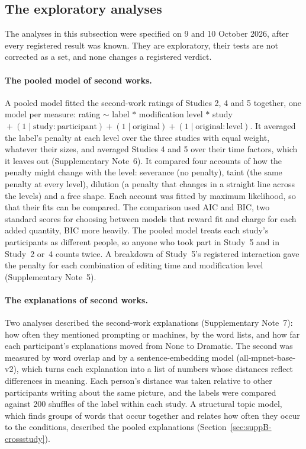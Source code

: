 \subsection*{The exploratory analyses}

The analyses in this subsection were specified on 9 and 10 October 2026, after every registered result was known. They are exploratory, their tests are not corrected as a set, and none changes a registered verdict.

\paragraph*{The pooled model of second works.}
A pooled model fitted the second-work ratings of Studies 2, 4 and 5 together, one model per measure: rating $\sim$ label $*$ modification level $*$ study${}+ (1 \mid \textrm{study}{:}\textrm{participant}) + (1 \mid \textrm{original}) + (1 \mid \textrm{original}{:}\textrm{level})$. It averaged the label's penalty at each level over the three studies with equal weight, whatever their sizes, and averaged Studies 4 and 5 over their time factors, which it leaves out (Supplementary Note~6). It compared four accounts of how the penalty might change with the level: severance (no penalty), taint (the same penalty at every level), dilution (a penalty that changes in a straight line across the levels) and a free shape. Each account was fitted by maximum likelihood, so that their fits can be compared. The comparison used AIC and BIC, two standard scores for choosing between models that reward fit and charge for each added quantity, BIC more heavily. The pooled model treats each study's participants as different people, so anyone who took part in Study~5 and in Study~2 or~4 counts twice. A breakdown of Study~5's registered interaction gave the penalty for each combination of editing time and modification level (Supplementary Note~5).

\paragraph*{The explanations of second works.}
Two analyses described the second-work explanations (Supplementary Note~7): how often they mentioned prompting or machines, by the word lists, and how far each participant's explanations moved from None to Dramatic. The second was measured by word overlap and by a sentence-embedding model (all-mpnet-base-v2), which turns each explanation into a list of numbers whose distances reflect differences in meaning.\cite{reimers2019sentencebert,sentencetransformers2021allmpnet} Each person's distance was taken relative to other participants writing about the same picture, and the labels were compared against 200 shuffles of the label within each study. A structural topic model, which finds groups of words that occur together and relates how often they occur to the conditions, described the pooled explanations (Section~\ref{sec:suppB-crossstudy}).

